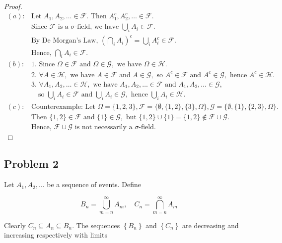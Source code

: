 \documentclass[letterpaper, 11pt]{article}
\newcommand{\1}{\mathds{1}}	%
\theoremstyle{definition}
\begin{document}
\begin{proof}
  \begin{align*}
    (a):& \text{Let } A_1, A_2, \ldots \in \mathcal{F}. \text{ Then } A_1^c, A_2^c, \ldots \in \mathcal{F}. \nonumber\\
    &\text{Since } \mathcal{F} \text{ is a $\sigma$-field, we have } \bigcup_i A_i \in \mathcal{F}. \nonumber\\
    &\text{By De Morgan's Law, } \left(\bigcap_i A_i\right)^c = \bigcup_i A_i^c \in \mathcal{F}. \nonumber\\
    &\text{Hence, } \bigcap_i A_i \in \mathcal{F}. \nonumber\\
    (b):& \text{1. Since } \Omega \in \mathcal{F} \text{ and } \Omega \in \mathcal{G}, \text{ we have } \Omega \in \mathcal{H}. \nonumber\\
    &\text{2. } \forall A\in \mathcal{H}, \text{ we have } A \in \mathcal{F} \text{ and } A \in \mathcal{G}, \text{ so } A^c \in \mathcal{F} \text{ and } A^c \in \mathcal{G}, \text{ hence } A^c \in \mathcal{H}. \nonumber\\
    &\text{3. } \forall A_1, A_2, \ldots \in \mathcal{H}, \text{ we have } A_1, A_2, \ldots \in \mathcal{F} \text{ and } A_1, A_2, \ldots \in \mathcal{G}, \nonumber\\
    &\quad\text{so } \bigcup_i A_i \in \mathcal{F} \text{ and } \bigcup_i A_i \in \mathcal{G}, \text{ hence } \bigcup_i A_i \in \mathcal{H}. \nonumber\\
    (c):& \text{Counterexample: Let } \Omega = \{1, 2, 3\}, \mathcal{F} = \{\emptyset, \{1, 2\}, \{3\}, \Omega\}, \mathcal{G} = \{\emptyset, \{1\}, \{2, 3\}, \Omega\}. \nonumber\\
    &\text{Then } \{1, 2\} \in \mathcal{F} \text{ and } \{1\} \in \mathcal{G}, \text{ but } \{1, 2\} \cup \{1\} =  \{1, 2\} \notin \mathcal{F} \cup \mathcal{G}. \nonumber\\
    &\text{Hence, } \mathcal{F} \cup \mathcal{G} \text{ is not necessarily a $\sigma$-field.} \nonumber
  \end{align*}
   \end{proof}
\subsection*{Problem 2}
Let $A_{1}, A_{2}, \ldots$ be a sequence of events. Define

$$B_{n}=\bigcup_{m=n}^{\infty} A_{m}, \quad C_{n}=\bigcap_{m=n}^{\infty} A_{m}$$

Clearly $C_{n} \subseteq A_{n} \subseteq B_{n}$. The sequences $\left\{B_{n}\right\}$ and $\left\{C_{n}\right\}$ are decreasing and increasing respectively with limits
\end{document}
